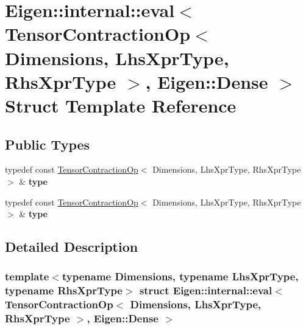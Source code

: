 \hypertarget{struct_eigen_1_1internal_1_1eval_3_01_tensor_contraction_op_3_01_dimensions_00_01_lhs_xpr_type_0ae5a9acfb75ebc4b7f37699317bff474}{}\section{Eigen\+:\+:internal\+:\+:eval$<$ Tensor\+Contraction\+Op$<$ Dimensions, Lhs\+Xpr\+Type, Rhs\+Xpr\+Type $>$, Eigen\+:\+:Dense $>$ Struct Template Reference}
\label{struct_eigen_1_1internal_1_1eval_3_01_tensor_contraction_op_3_01_dimensions_00_01_lhs_xpr_type_0ae5a9acfb75ebc4b7f37699317bff474}
\subsection*{Public Types}
\begin{DoxyCompactItemize}
\item 
\mbox{\label{struct_eigen_1_1internal_1_1eval_3_01_tensor_contraction_op_3_01_dimensions_00_01_lhs_xpr_type_0ae5a9acfb75ebc4b7f37699317bff474_a97c99a8e8d4ac8fd84e5ef777a0b3c89}} 
typedef const \hyperlink{class_eigen_1_1_tensor_contraction_op}{Tensor\+Contraction\+Op}$<$ Dimensions, Lhs\+Xpr\+Type, Rhs\+Xpr\+Type $>$ \& {\bfseries type}
\item 
\mbox{\label{struct_eigen_1_1internal_1_1eval_3_01_tensor_contraction_op_3_01_dimensions_00_01_lhs_xpr_type_0ae5a9acfb75ebc4b7f37699317bff474_a97c99a8e8d4ac8fd84e5ef777a0b3c89}} 
typedef const \hyperlink{class_eigen_1_1_tensor_contraction_op}{Tensor\+Contraction\+Op}$<$ Dimensions, Lhs\+Xpr\+Type, Rhs\+Xpr\+Type $>$ \& {\bfseries type}
\end{DoxyCompactItemize}


\subsection{Detailed Description}
\subsubsection*{template$<$typename Dimensions, typename Lhs\+Xpr\+Type, typename Rhs\+Xpr\+Type$>$\newline
struct Eigen\+::internal\+::eval$<$ Tensor\+Contraction\+Op$<$ Dimensions, Lhs\+Xpr\+Type, Rhs\+Xpr\+Type $>$, Eigen\+::\+Dense $>$}



